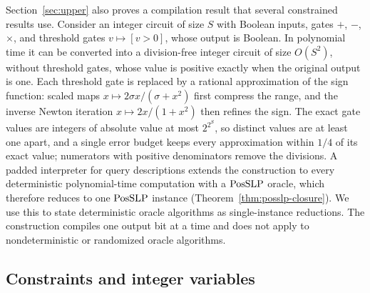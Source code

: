 Section~\ref{sec:upper} also proves a compilation result that several
constrained results use. Consider an integer circuit of size $S$ with Boolean
inputs, gates $+$, $-$, $\times$, and threshold gates $v\mapsto[v>0]$, whose
output is Boolean. In polynomial time it can be converted into a
division-free integer circuit of size $O(S^2)$, without threshold gates,
whose value is positive exactly when the original output is one. Each
threshold gate is replaced by a rational approximation of the sign function:
scaled maps $x\mapsto2\sigma x/(\sigma+x^2)$ first compress the range, and the
inverse Newton iteration $x\mapsto2x/(1+x^2)$ then refines the sign. The
exact gate values are integers of absolute value at most $2^{2^S}$, so
distinct values are at least one apart, and a single error budget keeps every
approximation within $1/4$ of its exact value; numerators with positive
denominators remove the divisions. A padded interpreter for query
descriptions extends the construction to every deterministic polynomial-time
computation with a $\mathrm{PosSLP}$ oracle, which therefore reduces to one $\mathrm{PosSLP}$
instance (Theorem~\ref{thm:posslp-closure}). We use this to state
deterministic oracle algorithms as single-instance reductions. The
construction compiles one output bit at a time and does not apply to
nondeterministic or randomized oracle algorithms.

\subsection{Constraints and integer variables}
\label{sec:intro-constraints}

